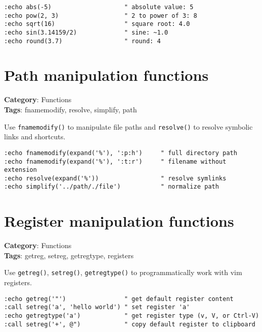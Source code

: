 {\begin{Exa*}{}
\begin{Verbatim}[fontsize=\footnotesize, breaklines, breakanywhere]
:echo abs(-5)                    " absolute value: 5
:echo pow(2, 3)                  " 2 to power of 3: 8
:echo sqrt(16)                   " square root: 4.0
:echo sin(3.14159/2)             " sine: ~1.0
:echo round(3.7)                 " round: 4
\end{Verbatim}
\end{Exa*}

\section{Path manipulation functions}

\textbf{Category}: Functions\\ \textbf{Tags}: fnamemodify, resolve, simplify, path
\vspace{0.5cm}

Use {\footnotesize \Verb§fnamemodify()§} to manipulate file paths and {\footnotesize \Verb§resolve()§} to resolve symbolic links and shortcuts.

\begin{Exa*}{}
\begin{Verbatim}[fontsize=\footnotesize, breaklines, breakanywhere]
:echo fnamemodify(expand('%'), ':p:h')     " full directory path
:echo fnamemodify(expand('%'), ':t:r')     " filename without extension
:echo resolve(expand('%'))                 " resolve symlinks
:echo simplify('../path/./file')           " normalize path
\end{Verbatim}
\end{Exa*}

\section{Register manipulation functions}

\textbf{Category}: Functions\\ \textbf{Tags}: getreg, setreg, getregtype, registers
\vspace{0.5cm}

Use {\footnotesize \Verb§getreg()§}, {\footnotesize \Verb§setreg()§}, {\footnotesize \Verb§getregtype()§} to programmatically work with vim registers.

\begin{Exa*}{}
\begin{Verbatim}[fontsize=\footnotesize, breaklines, breakanywhere]
:echo getreg('"')                " get default register content
:call setreg('a', 'hello world') " set register 'a'
:echo getregtype('a')            " get register type (v, V, or Ctrl-V)
:call setreg('+', @")            " copy default register to clipboard
\end{Verbatim}
\end{Exa*}

}

